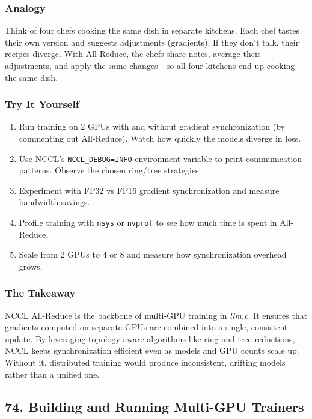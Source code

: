 \documentclass[
  letterpaper,
  DIV=11,
  numbers=noendperiod]{scrreprt}
\providecommand{\tightlist}{%
  \setlength{\itemsep}{0pt}\setlength{\parskip}{0pt}}
\begin{document}
\subsubsection{Analogy}\label{analogy-4}

Think of four chefs cooking the same dish in separate kitchens. Each
chef tastes their own version and suggests adjustments (gradients). If
they don't talk, their recipes diverge. With All-Reduce, the chefs share
notes, average their adjustments, and apply the same changes---so all
four kitchens end up cooking the same dish.

\subsubsection{Try It Yourself}\label{try-it-yourself-61}

\begin{enumerate}
\def\labelenumi{\arabic{enumi}.}
\tightlist
\item
  Run training on 2 GPUs with and without gradient synchronization (by
  commenting out All-Reduce). Watch how quickly the models diverge in
  loss.
\item
  Use NCCL's \texttt{NCCL\_DEBUG=INFO} environment variable to print
  communication patterns. Observe the chosen ring/tree strategies.
\item
  Experiment with FP32 vs FP16 gradient synchronization and measure
  bandwidth savings.
\item
  Profile training with \texttt{nsys} or \texttt{nvprof} to see how much
  time is spent in All-Reduce.
\item
  Scale from 2 GPUs to 4 or 8 and measure how synchronization overhead
  grows.
\end{enumerate}

\subsubsection{The Takeaway}\label{the-takeaway-62}

NCCL All-Reduce is the backbone of multi-GPU training in \emph{llm.c}.
It ensures that gradients computed on separate GPUs are combined into a
single, consistent update. By leveraging topology-aware algorithms like
ring and tree reductions, NCCL keeps synchronization efficient even as
models and GPU counts scale up. Without it, distributed training would
produce inconsistent, drifting models rather than a unified one.

\subsection{74. Building and Running Multi-GPU
Trainers}\label{building-and-running-multi-gpu-trainers}
\end{document}
